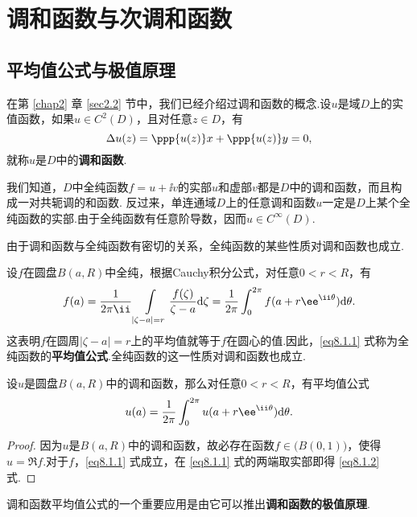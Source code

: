 \chapter{调和函数与次调和函数\label{chap8}}
\section{平均值公式与极值原理\label{sec8.1}}
在第 \ref{chap2} 章 \ref{sec2.2} 节中，我们已经介绍过调和函数的概念.设$u$是域$D$上的实值函数，如果$u\in C^2(D)$，且对任意$z\in D$，有
\[\Delta u(z)=\ppp{u(z)}x+\ppp{u(z)}y=0,\]
就称$u$是$D$中的\textbf{调和函数}.

我们知道，$D$中全纯函数$f=u+\ii v$的实部$u$和虚部$v$都是$D$中的调和函数，而且构成一对共轭调的和函数. 反过来，单连通域$D$上的任意调和函数$u$一定是$D$上某个全纯函数的实部.由于全纯函数有任意阶导数，因而$u\in C^\infty(D)$.

由于调和函数与全纯函数有密切的关系，全纯函数的某些性质对调和函数也成立.

设$f$在圆盘$B(a,R)$中全纯，根据Cauchy积分公式，对任意$0<r<R$，有
\begin{equation}\label{eq8.1.1}
f(a)=\frac1{2\pi\ii}\int\limits_{|\zeta-a|=r}\frac{f(\zeta)}{\zeta-a}\textrm d\zeta
=\frac1{2\pi}\int_0^{2\pi}f(a+r\ee^{\ii\theta})\textrm d\theta.
\end{equation}
这表明$f$在圆周$|\zeta-a|=r$上的平均值就等于$f$在圆心的值.因此，\eqref{eq8.1.1} 式称为全纯函数的\textbf{平均值公式}.全纯函数的这一性质对调和函数也成立.

\begin{theorem}\label{thm8.1.1}
设$u$是圆盘$B(a,R)$中的调和函数，那么对任意$0<r<R$，有平均值公式
\begin{equation}\label{eq8.1.2}
u(a)=\frac1{2\pi}\int_0^{2\pi}u(a+r\ee^{\ii\theta})\textrm d\theta.
\end{equation}
\end{theorem}
\begin{proof}
因为$u$是$B(a,R)$中的调和函数，故必存在函数$f\in\big(B(0,1)\big)$，使得$u=\Re f$.对于$f$，\eqref{eq8.1.1} 式成立，在 \eqref{eq8.1.1} 式的两端取实部即得 \eqref{eq8.1.2} 式.
\end{proof}

调和函数平均值公式的一个重要应用是由它可以推出\textbf{调和函数的极值原理}.

